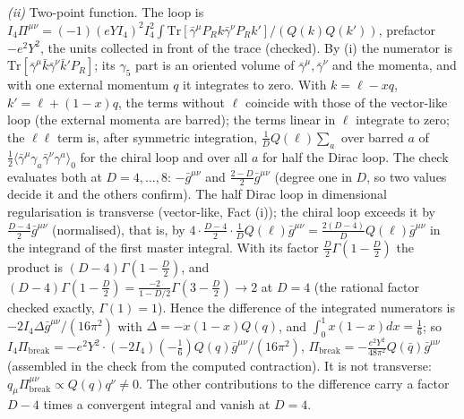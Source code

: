 \emph{(ii)} Two-point function. The loop is $I_{4}\Pi^{\mu\nu} = (-1)(eYI_{4})^{2}I_{4}^{2}\int\mathrm{Tr}[\bar\gamma^{\mu}P_{R}k\bar\gamma^{\nu}P_{R}k']/(Q(k)Q(k'))$, prefactor $-e^{2}Y^{2}$, the units collected in front of the trace (checked). By (i) the numerator is $\mathrm{Tr}[\bar\gamma^{\mu}\bar k\bar\gamma^{\nu}\bar k'P_{R}]$; its $\gamma_{5}$ part is an oriented volume of $\bar\gamma^{\mu}, \bar\gamma^{\nu}$ and the momenta, and with one external momentum $q$ it integrates to zero. With $k = \ell - xq$, $k' = \ell + (1-x)q$, the terms without $\ell$ coincide with those of the vector-like loop (the external momenta are barred); the terms linear in $\ell$ integrate to zero; the $\ell\ell$ term is, after symmetric integration, $\tfrac{1}{D}Q(\ell)\sum_{a}$ over barred $a$ of $\tfrac12\langle\bar\gamma^{\mu}\gamma_{a}\bar\gamma^{\nu}\gamma^{a}\rangle_{0}$ for the chiral loop and over all $a$ for half the Dirac loop. The check evaluates both at $D = 4, \ldots, 8$: $-\bar g^{\mu\nu}$ and $\tfrac{2-D}{2}\bar g^{\mu\nu}$ (degree one in $D$, so two values decide it and the others confirm). The half Dirac loop in dimensional regularisation is transverse (vector-like, Fact (i)); the chiral loop exceeds it by $\tfrac{D-4}{2}\bar g^{\mu\nu}$ (normalised), that is, by $4\cdot\tfrac{D-4}{2}\cdot\tfrac{1}{D}Q(\ell)\bar g^{\mu\nu} = \tfrac{2(D-4)}{D}Q(\ell)\bar g^{\mu\nu}$ in the integrand of the first master integral. With its factor $\tfrac{D}{2}\Gamma(1 - \tfrac{D}{2})$ the product is $(D-4)\Gamma(1 - \tfrac{D}{2})$, and $(D-4)\Gamma(1 - \tfrac{D}{2}) = \tfrac{-2}{1 - D/2}\Gamma(3 - \tfrac{D}{2}) \to 2$ at $D = 4$ (the rational factor checked exactly, $\Gamma(1) = 1$). Hence the difference of the integrated numerators is $-2I_{4}\Delta\bar g^{\mu\nu}/(16\pi^{2})$ with $\Delta = -x(1-x)Q(q)$, and $\int_{0}^{1}x(1-x)dx = \tfrac16$; so $I_{4}\Pi_{\mathrm{break}} = -e^{2}Y^{2}\cdot(-2I_{4})(-\tfrac16)Q(q)\bar g^{\mu\nu}/(16\pi^{2})$, $\Pi_{\mathrm{break}} = -\tfrac{e^{2}Y^{2}}{48\pi^{2}}Q(\bar q)\bar g^{\mu\nu}$ (assembled in the check from the computed contraction). It is not transverse: $q_{\mu}\Pi_{\mathrm{break}}^{\mu\nu} \propto Q(q)q^{\nu} \neq 0$. The other contributions to the difference carry a factor $D - 4$ times a convergent integral and vanish at $D = 4$.

